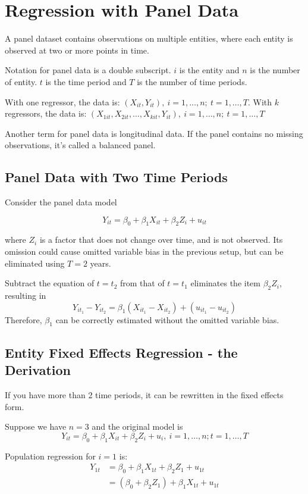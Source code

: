 \documentclass{article}
\begin{document}
\section{Regression with Panel Data}

A panel dataset contains observations on multiple entities, where each entity is observed at two or more points in time.

Notation for panel data is a double subscript.
$i$ is the entity and $n$ is the number of entity.
$t$ is the time period and $T$ is the number of time periods.

With one regressor, the data is: $(X_{it}, Y_{it}),\ i=1, \ldots, n;\ t=1, \ldots, T$.
With $k$ regressors, the data is: $(X_{1it}, X_{2it},\ldots, X_{kit}, Y_{it}),\ i=1, \ldots, n;\ t=1, \ldots, T$

Another term for panel data is longitudinal data.
If the panel contains no missing observations, it's called a balanced panel.

\subsection{Panel Data with Two Time Periods}

Consider the panel data model

\[
	Y_{it} = \beta_0 + \beta_1 X_{it} + \beta_2 Z_{i} + u_{it}
\]

where $Z_i$ is a factor that does not change over time, and is not observed.
Its omission could cause omitted variable bias in the previous setup, but can be eliminated using $T=2$ years.

Subtract the equation of $t=t_2$ from that of $t=t_1$ eliminates the item $\beta_2 Z_{i}$,
resulting in
\[
	Y_{it_1} - Y_{it_2} = \beta_1(X_{it_1} - X_{it_2}) + (u_{it_1} - u_{it_2})
\]
Therefore, $\beta_1$ can be correctly estimated without the omitted variable bias.

\subsection{Entity Fixed Effects Regression - the Derivation}

If you have more than 2 time periods, it can be rewritten in the fixed effects form.

Suppose we have $n=3$ and the original model is
\[
	Y_{it} = \beta_0 + \beta_1 X_{it} + \beta_2 Z_i + u_i,\ i=1, \ldots, n; t = 1,\ldots, T
\]

Population regression for $i=1$ is:
\[
	\begin{aligned}
	Y_{1t} &= \beta_0 + \beta_1 X_{1t} + \beta_2 Z_1 + u_{1t}\\
				&= (\beta_0 + \beta_2 Z_1) + \beta_1 X_{1t} + u_{1t}
	\end{aligned}
\]
\end{document}
